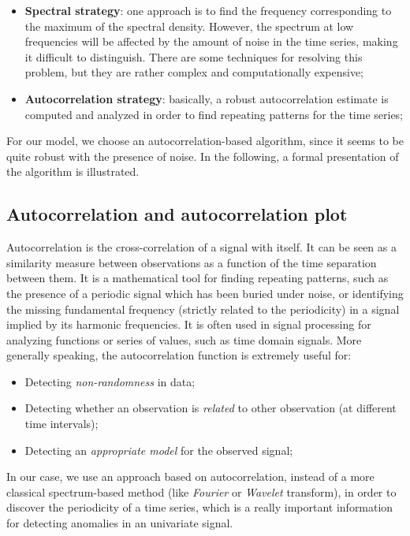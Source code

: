 \documentclass[12pt,a4paper,cucitura]{toptesi}
\begin{document}
\begin{itemize}
\item \textbf{Spectral strategy}: one approach is to find the frequency corresponding to the maximum of the spectral density. However, the spectrum at low frequencies will be affected by the amount of noise in the time series, making it difficult to distinguish. There are some techniques for resolving this problem, but they are rather complex and computationally expensive;

\item \textbf{Autocorrelation strategy}: basically, a robust autocorrelation estimate is computed and analyzed in order to find repeating patterns for the time series;
\end{itemize}

For our model, we choose an autocorrelation-based algorithm, since it seems to be quite robust with the presence of noise. 
In the following, a formal presentation of the algorithm is illustrated.

\subsection{Autocorrelation and autocorrelation plot}

Autocorrelation is the cross-correlation of a signal with itself. 
It can be seen as a similarity measure between observations as a function of the time separation between them. 
It is a mathematical tool for finding repeating patterns, such as the presence of a periodic signal which has been buried under noise, or identifying the missing fundamental frequency (strictly related to the periodicity) in a signal implied by its harmonic frequencies. 
It is often used in signal processing for analyzing functions or series of values, such as time domain signals.
More generally speaking, the autocorrelation function is extremely useful for:
\begin{itemize}
\item Detecting \emph{non-randomness} in data;
\item Detecting whether an observation is \emph{related} to other observation (at different time intervals);
\item Detecting an \emph{appropriate model} for the observed signal;
\end{itemize}

In our case, we use an approach based on autocorrelation, instead of a more classical spectrum-based method (like \emph{Fourier} or \emph{Wavelet} transform), in order to discover the periodicity of a time series, which is a really important information for detecting anomalies in an univariate signal.
\end{document}
